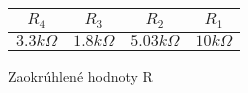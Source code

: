 \documentclass[main.tex]{subfiles}
\begin{document}
\begin{multicols*}{2}
		\vskip 0.1cm
		\begin{tablehere}
			\centering
			\begin{tabular}{cccc}
				$R_4$ & $R_3$ & $R_2$ & $R_1$ \\
				\hline
				$3.3k\Omega$ & $1.8k\Omega$ & $5.03k\Omega$ & $10k\Omega$ \\
			\end{tabular}
			\caption{Zaokrúhlené hodnoty R} \label{tab:delicOdpory2}
		\end{tablehere}
	\end{multicols*}

	
\end{document}
